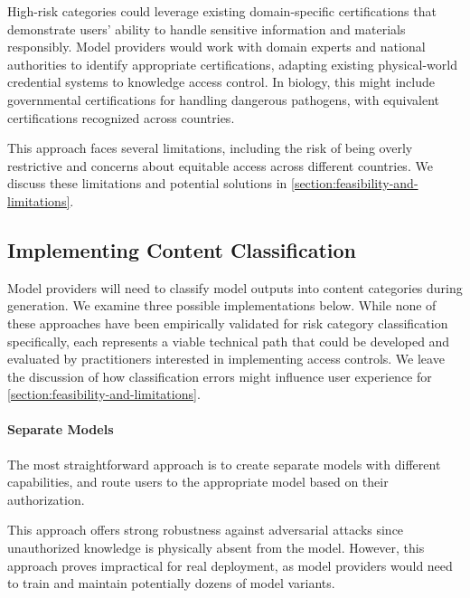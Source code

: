 \documentclass{article}
\theoremstyle{plain}
\theoremstyle{definition}
\theoremstyle{remark}
\begin{document}
High-risk categories could leverage existing domain-specific certifications that demonstrate users' ability to handle sensitive information and materials responsibly.
Model providers would work with domain experts and national authorities to identify appropriate certifications, adapting existing physical-world credential systems to knowledge access control.
In biology, this might include governmental certifications for handling dangerous pathogens, with equivalent certifications recognized across countries.

This approach faces several limitations, including the risk of being overly restrictive and concerns about equitable access across different countries.
We discuss these limitations and potential solutions in \cref{section:feasibility-and-limitations}.

\subsection{Implementing Content Classification} \label{section:content-classification}

Model providers will need to classify model outputs into content categories during generation.
We examine three possible implementations below.
While none of these approaches have been empirically validated for risk category classification specifically, each represents a viable technical path that could be developed and evaluated by practitioners interested in implementing access controls.
We leave the discussion of how classification errors might influence user experience for \cref{section:feasibility-and-limitations}.

\paragraph{Separate Models}

The most straightforward approach is to create separate models with different capabilities, and route users to the appropriate model based on their authorization.

This approach offers strong robustness against adversarial attacks since unauthorized knowledge is physically absent from the model.
However, this approach proves impractical for real deployment, as model providers would need to train and maintain potentially dozens of model variants.
\end{document}
